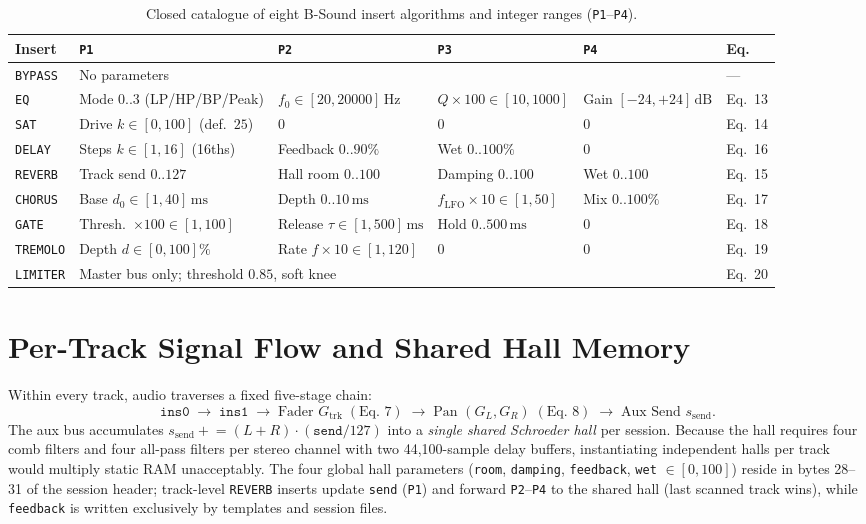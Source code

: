 \begin{table}[htbp]
\centering
\caption{Closed catalogue of eight B-Sound insert algorithms and integer ranges (\texttt{P1}--\texttt{P4}).}
\scriptsize
\begin{tabular}{@{}llllll@{}}
\toprule
Insert & \texttt{P1} & \texttt{P2} & \texttt{P3} & \texttt{P4} & Eq. \\
\midrule
\texttt{BYPASS} & \multicolumn{4}{l}{No parameters} & --- \\
\texttt{EQ} & Mode $0..3$ (LP/HP/BP/Peak) & $f_0 \in [20, 20000]\,\text{Hz}$ & $Q\times 100 \in [10, 1000]$ & Gain $[-24, +24]\,\text{dB}$ & Eq.~13 \\
\texttt{SAT} & Drive $k \in [0, 100]$ (def.\ $25$) & $0$ & $0$ & $0$ & Eq.~14 \\
\texttt{DELAY} & Steps $k \in [1, 16]$ (16ths) & Feedback $0..90\%$ & Wet $0..100\%$ & $0$ & Eq.~16 \\
\texttt{REVERB} & Track send $0..127$ & Hall room $0..100$ & Damping $0..100$ & Wet $0..100$ & Eq.~15 \\
\texttt{CHORUS} & Base $d_0 \in [1, 40]\,\text{ms}$ & Depth $0..10\,\text{ms}$ & $f_{\mathrm{LFO}}\times 10 \in [1, 50]$ & Mix $0..100\%$ & Eq.~17 \\
\texttt{GATE} & Thresh.\ $\times 100 \in [1, 100]$ & Release $\tau \in [1, 500]\,\text{ms}$ & Hold $0..500\,\text{ms}$ & $0$ & Eq.~18 \\
\texttt{TREMOLO} & Depth $d \in [0, 100]\%$ & Rate $f\times 10 \in [1, 120]$ & $0$ & $0$ & Eq.~19 \\
\texttt{LIMITER} & \multicolumn{4}{l}{Master bus only; threshold $0.85$, soft knee} & Eq.~20 \\
\bottomrule
\end{tabular}
\end{table}

\section{Per-Track Signal Flow and Shared Hall Memory}

Within every track, audio traverses a fixed five-stage chain:
\[
\texttt{ins0} \;\longrightarrow\; \texttt{ins1} \;\longrightarrow\; \text{Fader } G_{\mathrm{trk}}\;(\text{Eq.~7}) \;\longrightarrow\; \text{Pan } (G_L, G_R)\;(\text{Eq.~8}) \;\longrightarrow\; \text{Aux Send } s_{\mathrm{send}}.
\]
The aux bus accumulates $s_{\mathrm{send}} \mathrel{+}= (L + R) \cdot (\texttt{send}/127)$ into a \emph{single shared Schroeder hall} per session. Because the hall requires four comb filters and four all-pass filters per stereo channel with two 44,100-sample delay buffers, instantiating independent halls per track would multiply static RAM unacceptably. The four global hall parameters (\texttt{room}, \texttt{damping}, \texttt{feedback}, \texttt{wet} $\in [0,100]$) reside in bytes 28--31 of the session header; track-level \texttt{REVERB} inserts update \texttt{send} (\texttt{P1}) and forward \texttt{P2}--\texttt{P4} to the shared hall (last scanned track wins), while \texttt{feedback} is written exclusively by templates and session files.

